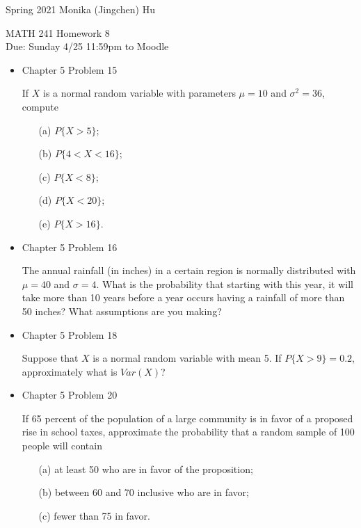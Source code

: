 \documentclass[11pt]{article}
\begin{document}
\enlargethispage{\baselineskip}

Spring 2021 \hfill Monika (Jingchen) Hu\\

\begin{center}
{\huge MATH 241 Homework 8}	\\
Due: Sunday 4/25 11:59pm to Moodle
\end{center}
\vspace{0.5cm}


\begin{itemize}


    \item
    Chapter 5 Problem 15
    
    If $X$ is a normal random variable with parameters $\mu = 10$ and $\sigma^2 = 36$, compute
    
    \begin{itemize}
    \item[(a)] $P\{X > 5\}$;
    \item[(b)] $P\{4 < X < 16\}$;
    \item[(c)] $P\{X < 8\}$;
    \item[(d)] $P\{X < 20\}$;
    \item[(e)] $P\{X > 16\}$.
    \end{itemize}
    
    \item
    Chapter 5 Problem 16
    
    The annual rainfall (in inches) in a certain region is normally distributed with $\mu = 40$ and $\sigma = 4$. What is the probability that starting with this year, it will take more than 10 years before a year occurs having a rainfall of more than 50 inches? What assumptions are you making?

    \item
    Chapter 5 Problem  18
    
    Suppose that $X$ is a normal random variable with mean 5. If $P\{X > 9\} = 0.2$, approximately what is $Var(X)$? 
    
    \item 
    Chapter 5 Problem 20
    
    If 65 percent of the population of a large community is in favor of a proposed rise in school taxes, approximate the probability that a random sample of 100 people will contain
    
    \begin{itemize}
    \item[(a)] at least 50 who are in favor of the proposition;
    \item[(b)] between 60 and 70 inclusive who are in favor;
    \item[(c)] fewer than 75 in favor.
    \end{itemize}
    

\end{itemize}
\end{document}
